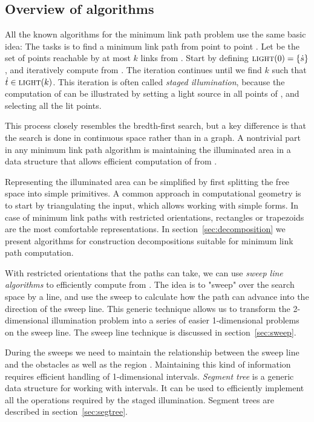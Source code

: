 \documentclass[english,gradu]{tktltiki2018}
\begin{document}
\subsection{Overview of algorithms}\label{sec:overview}

All the known algorithms for the minimum link path problem use the same basic idea:
The tasks is to find a minimum link path from point \spt to point \ept.
Let  be the set of points reachable by at most $k$ links from \spt.
Start by defining $\textsc{light}(0)=\left\{\dot{s}\right\}$, and iteratively compute  from .
The iteration continues until we find $k$ such that $\dot{t}\in\textsc{light}(k)$.
This iteration is often called \emph{staged illumination}, because the computation of  can be illustrated by setting a light source in all points of , and selecting all the lit points.

This process closely resembles the bredth-first search, but a key difference is that the search is done in continuous space rather than in a graph.
A nontrivial part in any minimum link path algorithm is maintaining the illuminated area in a data structure that allows efficient computation of  from .

Representing the illuminated area can be simplified by first splitting the free space into simple primitives.
A common approach in computational geometry is to start by triangulating the input, which allows working with simple forms.
In case of minimum link paths with restricted orientations, rectangles or trapezoids are the most comfortable representations.
In section~\ref{sec:decomposition} we present algorithms for construction decompositions suitable for minimum link path computation.

With restricted orientations that the paths can take, we can use \emph{sweep line algorithms} to efficiently compute  from .
The idea is to "sweep" over the search space by a line, and use the sweep to calculate how the path can advance into the direction of the sweep line.
This generic technique allows us to transform the 2-dimensional illumination problem into a series of easier 1-dimensional problems on the sweep line.
The sweep line technique is discussed in section~\ref{sec:sweep}.

During the sweeps we need to maintain the relationship between the sweep line and the obstacles as well as the region .
Maintaining this kind of information requires efficient handling of 1-dimensional intervals.
\emph{Segment tree} is a generic data structure for working with intervals.
It can be used to efficiently implement all the operations required by the staged illumination.
Segment trees are described in section~\ref{sec:segtree}.
\end{document}
